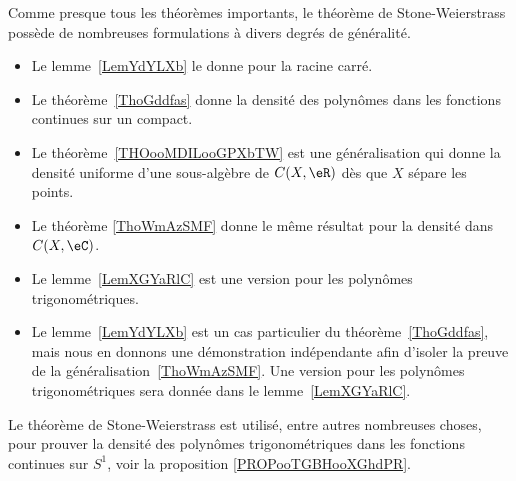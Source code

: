 Comme presque tous les théorèmes importants, le théorème de Stone-Weierstrass possède de nombreuses formulations à divers degrés de généralité.
\begin{itemize}
	\item Le lemme~\ref{LemYdYLXb} le donne pour la racine carré.
	\item Le théorème~\ref{ThoGddfas} donne la densité des polynômes dans les fonctions continues sur un compact.
	\item Le théorème~\ref{THOooMDILooGPXbTW} est une généralisation qui donne la densité uniforme d'une sous-algèbre de \( C(X,\eR)\) dès que \( X\) sépare les points.
	\item Le théorème \ref{ThoWmAzSMF} donne le même résultat pour la densité dans \( C(X,\eC)\).
	\item Le lemme~\ref{LemXGYaRlC} est une version pour les polynômes trigonométriques.
	\item
	      Le lemme~\ref{LemYdYLXb} est un cas particulier du
	      théorème~\ref{ThoGddfas}, mais nous en donnons une démonstration indépendante afin d'isoler la preuve
	      de la généralisation~\ref{ThoWmAzSMF}.
	      Une version pour les polynômes trigonométriques sera donnée dans le lemme~\ref{LemXGYaRlC}.
\end{itemize}
Le théorème de Stone-Weierstrass est utilisé, entre autres nombreuses choses, pour prouver la densité des polynômes trigonométriques dans les fonctions continues sur \( S^1\), voir la proposition \ref{PROPooTGBHooXGhdPR}.

